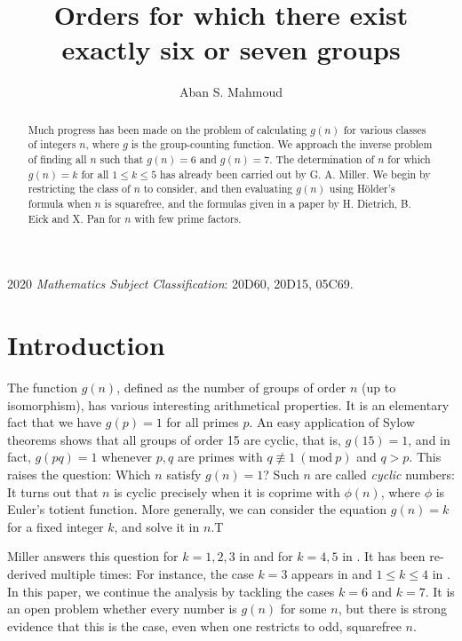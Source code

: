 \documentclass{article}
\newcommand{\Mod}[1]{\ (\mathrm{mod} \ #1)}
\theoremstyle{plain}
\theoremstyle{definition}
\begin{document}
\title{Orders for which there exist exactly six or seven groups}
\author{Aban S. Mahmoud}
\maketitle

\begin{abstract}
	Much progress has been made on the problem of calculating $g(n)$ for various classes of integers $n$,  where $g$ is the group-counting function. We approach the inverse problem of finding all $n$ such that $g(n) = 6$ and $g(n) = 7$. The determination of $n$ for which $g(n) = k$ for all $1 \le k \le 5$ has already been carried out by G. A. Miller. We begin by restricting the class of $n$ to consider, and then evaluating $g(n)$ using Hölder's formula when $n$ is squarefree, and the formulas given in a paper by H. Dietrich, B. Eick and X. Pan for $n$ with few prime factors.
\end{abstract}

\textup{2020} \textit{Mathematics Subject Classification}: \textup{20D60, 20D15, 05C69}.

\section{Introduction}
The function $g(n)$, defined as the number of groups of order $n$ (up to isomorphism), has various interesting arithmetical properties. It is an elementary fact that we have $g(p) = 1$ for all primes $p$. An easy application of Sylow theorems shows that all groups of order 15 are cyclic, that is, $g(15) = 1$, and in fact, $g(pq) = 1$ whenever $p, q$ are primes with $q \not\equiv 1 \Mod{p}$ and $q > p$. This raises the question: Which $n$ satisfy $g(n) = 1$? Such $n$ are called \emph{cyclic} numbers: It turns out that $n$ is cyclic precisely when it is coprime with $\phi(n)$, where $\phi$ is Euler's totient function. More generally, we can consider the equation $g(n) = k$ for a fixed integer $k$, and solve it in $n$.T

Miller answers this question for $k = 1, 2, 3$ in {\cite{miller1}} and for $k = 4, 5$ in {\cite{miller2}}. It has been re-derived multiple times: For instance, the case $k = 3$ appears in {\cite{olsson}} and $1 \le k \le 4$ in {\cite{gnumoas}}. In this paper, we continue the analysis by tackling the cases $k = 6$ and $k = 7$. It is an open problem whether every number is $g(n)$ for some $n$, but there is strong evidence that this is the case, even when one restricts to odd, squarefree $n$.
\end{document}
